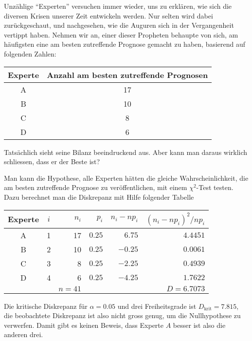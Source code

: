 Unzählige ``Experten'' versuchen immer wieder, uns zu erklären,
wie sich die diversen Krisen unserer Zeit entwickeln werden. Nur
selten wird dabei zurückgeschaut, und nachgesehen, wie die Auguren
sich in der Vergangenheit vertippt haben. Nehmen wir an, einer
dieser Propheten behaupte von sich, am häufigsten eine am besten
zutreffende
Prognose gemacht zu haben, basierend auf folgenden Zahlen:
\begin{center}
\begin{tabular}{cc}
\hline
Experte&Anzahl am besten zutreffende Prognosen\\
\hline
A&17\\
B&10\\
C&8\\
D&6\\
\hline
\end{tabular}
\end{center}
Tatsächlich sieht seine Bilanz beeindruckend aus. Aber
kann man daraus wirklich schliessen, dass er der Beste ist?

\begin{loesung}
Man kann die Hypothese, alle Experten hätten die gleiche Wahrscheinlichkeit,
die am besten zutreffende Prognose zu veröffentlichen, mit einem $\chi^2$-Test
testen. Dazu berechnet man die Diskrepanz mit Hilfe folgender Tabelle
\begin{center}
\begin{tabular}{|c|crrrr|}
\hline
Experte&
$i$& $n_i$& $p_i$&$n_i-np_i$&$(n_i-np_i)^2/np_i$\\
\hline
A&  1&    17&$0.25$&$6.75$ &$4.4451$\\
B&  2&    10&$0.25$&$-0.25$&$0.0061$\\
C&  3&     8&$0.25$&$-2.25$&$0.4939$\\
D&  4&     6&$0.25$&$-4.25$&$1.7622$\\
\hline
 &   &$n=41$&      &      &$D=6.7073$\\
\hline
\end{tabular}
\end{center}
Die kritische Diskrepanz für $\alpha=0.05$ und drei Freiheitsgrade ist
$D_{\text{krit}}=7.815$, die beobachtete Diskrepanz ist also nicht
gross genug, um die Nullhypothese zu verwerfen. Damit gibt es keinen
Beweis, dass Experte $A$ besser ist also die anderen drei.
\end{loesung}

